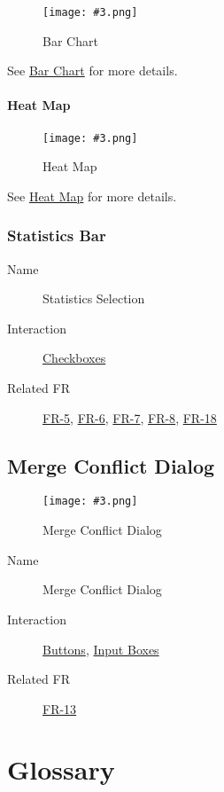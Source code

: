 \documentclass[10pt,a4paper]{report}
\newcommand{\refer}[2]{\hyperref[#1]{\textcolor{col:reference}{#2}}}
\newcommand{\ui}[3]{
    \begin{description}
        \item[Name]{#1}
        \item[Interaction]{#2}
        \item[Related FR]{#3}
    \end{description}
}
\newcommand{\refg}[2]{\refer{glo:#1}{#2}}
\newcommand{\includeimage}[5]{
    \begin{figure}[H]
        #1
        \texttt{[image: \#3.png]}
        \caption{#4}
        \label{fig:#5}
    \end{figure}
}
\newcommand{\includegraph}[7]{
    \graphicspath{{#1}}
    \includeimage{#2}{#3}{#4}{#5}{#6}
    \graphicspath{{#7}}
}
\newcommand{\imagepath}{Images/}
\newcommand{\graphpath}{Images/Graphs/}
\begin{document}
\includegraph{\graphpath}{}{0.4}{Bar Chart}{Bar Chart}{bar_chart}{\imagepath}
See \refg{bar_chart}{Bar Chart} for more details.

\subsubsection{Heat Map}

\includegraph{\graphpath}{}{0.4}{Heat Map}{Heat Map}{heat_map}{\imagepath}
See \refg{heatmap}{Heat Map} for more details.

\subsection{Statistics Bar}
\label{sec:visualizer:statistics}
\ui{Statistics Selection}{\refer{it:checkbox}{Checkboxes}}{\refer{FR-5}{FR-5}, \refer{FR-6}{FR-6}, \refer{FR-7}{FR-7}, \refer{FR-8}{FR-8}, \refer{FR-18}{FR-18}}

\section{Merge Conflict Dialog}
\label{sec:merge_conflict}
\includeimage{}{0.5}{Merge Conflict Dialog}{Merge Conflict Dialog}{Merge Conflict Dialog}
\ui{Merge Conflict Dialog}{\refer{it:button}{Buttons}, \refer{it:input_box}{Input Boxes}}{\refer{FR-13}{FR-13}}

\chapter{Glossary}
\end{document}
